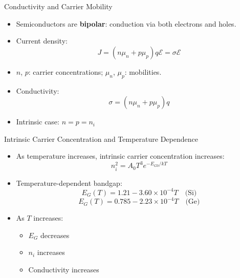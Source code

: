 \begin{frame}{Conductivity and Carrier Mobility}
    \begin{itemize}
        \item Semiconductors are \textbf{bipolar}: conduction via both electrons and holes.
        \item Current density:
        \begin{equation}
        J = (n \mu_n + p \mu_p)q\mathcal{E} = \sigma \mathcal{E} \tag{2-16}
        \end{equation}
        \item $n$, $p$: carrier concentrations; $\mu_n$, $\mu_p$: mobilities.
        \item Conductivity:
        \begin{equation}
        \sigma = (n \mu_n + p \mu_p)q \tag{2-17}
        \end{equation}
        \item Intrinsic case: $n = p = n_i$
    \end{itemize}
\end{frame}

\begin{frame}{Intrinsic Carrier Concentration and Temperature Dependence}
    \begin{itemize}
        \item As temperature increases, intrinsic carrier concentration increases:
        \begin{equation}
        n_i^2 = A_0 T^3 e^{-E_{G0}/kT} \tag{2-18}
        \end{equation}
        \item Temperature-dependent bandgap:
        \begin{equation}
        E_G(T) = 1.21 - 3.60 \times 10^{-4}T \quad \text{(Si)} \tag{2-19}
        \end{equation}
        \begin{equation}
        E_G(T) = 0.785 - 2.23 \times 10^{-4}T \quad \text{(Ge)} \tag{2-20}
        \end{equation}
        \item As $T$ increases:
        \begin{itemize}
            \item $E_G$ decreases
            \item $n_i$ increases
            \item Conductivity increases
        \end{itemize}
    \end{itemize}
\end{frame}

